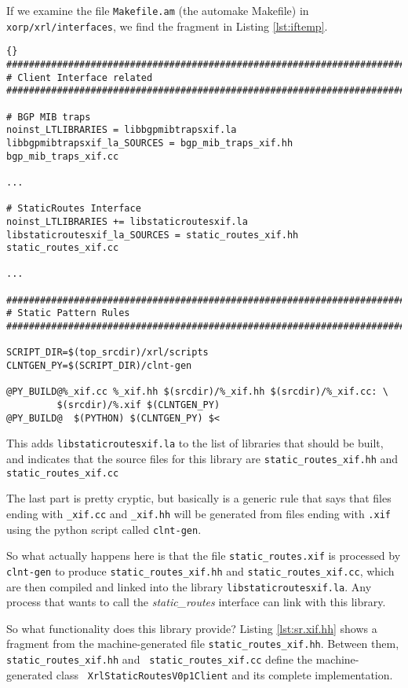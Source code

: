 \documentclass[11pt]{article}
\newcommand{\stt}{\tt\small}
\newcommand{\SRI}{{\it static\_routes}\xspace}
\begin{document}
If we examine the file {\stt Makefile.am} (the automake Makefile) in
{\stt xorp/xrl/interfaces}, we find the fragment in Listing
\ref{lst:iftemp}.
\begin{lstlisting}[caption={ Fragment from {\stt xorp/xrl/interfaces/Makefile.am} %
                                     \label{lst:iftemp} } ]{}
###############################################################################
# Client Interface related
###############################################################################

# BGP MIB traps
noinst_LTLIBRARIES = libbgpmibtrapsxif.la
libbgpmibtrapsxif_la_SOURCES = bgp_mib_traps_xif.hh bgp_mib_traps_xif.cc

...

# StaticRoutes Interface
noinst_LTLIBRARIES += libstaticroutesxif.la
libstaticroutesxif_la_SOURCES = static_routes_xif.hh static_routes_xif.cc

...

###############################################################################
# Static Pattern Rules
###############################################################################

SCRIPT_DIR=$(top_srcdir)/xrl/scripts
CLNTGEN_PY=$(SCRIPT_DIR)/clnt-gen

@PY_BUILD@%_xif.cc %_xif.hh $(srcdir)/%_xif.hh $(srcdir)/%_xif.cc: \
         $(srcdir)/%.xif $(CLNTGEN_PY)
@PY_BUILD@	$(PYTHON) $(CLNTGEN_PY) $<

\end{lstlisting}%

This adds {\stt libstaticroutesxif.la} to the list of libraries that
should be built, and indicates that the source files for this library
are {\stt static\_routes\_xif.hh} and {\stt static\_routes\_xif.cc}

The last part is pretty cryptic, but basically is a generic rule that
says that files ending with {\stt \_xif.cc} and {\stt \_xif.hh} will be
generated from files ending with {\stt .xif} using the python script
called {\stt clnt-gen}.

So what actually happens here is that the file {\stt static\_routes.xif}
is processed by {\stt clnt-gen} to produce {\stt static\_routes\_xif.hh}
and {\stt static\_routes\_xif.cc}, which are then compiled and linked
into the library {\stt libstaticroutesxif.la}.  Any process that wants
to call the \SRI interface can link with this library.

So what functionality does this library provide?  Listing
\ref{lst:sr.xif.hh} shows a fragment from the machine-generated file
{\stt static\_routes\_xif.hh}.  Between them, {\stt static\_routes\_xif.hh} and {\stt
static\_routes\_xif.cc} define the machine-generated class {\stt
XrlStaticRoutesV0p1Client} and its complete implementation.
\end{document}
